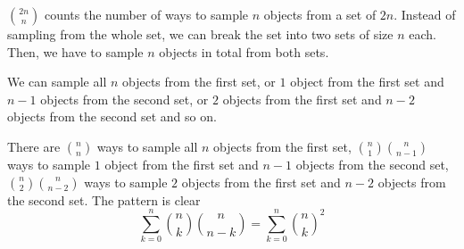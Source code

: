 ${2n \choose n}$ counts the number of ways to sample $n$ objects from a 
set of $2n$. Instead of sampling from the whole set, we can break the set into 
two sets of size $n$ each. Then, we have to sample $n$ objects in total 
from both sets. 

We can sample all $n$ objects from the first set, or $1$ object from the 
first set and $n-1$ objects from the second set, or $2$ objects from the first 
set and $n-2$ objects from the second set and so on.

There are ${n \choose n}$ ways to sample all $n$ objects from the first set, 
${n \choose 1} {n \choose n-1}$ ways to sample $1$ object from the first set 
and $n-1$ objects from the second set, ${n \choose 2} {n \choose n-2}$ ways to 
sample $2$ objects from the first set and $n-2$ objects from the second set. 
The pattern is clear 
$$ \sum_{k=0}^{n} {n \choose k} {n \choose n-k} = \sum_{k=0}^{n} {n \choose k}^{2}$$